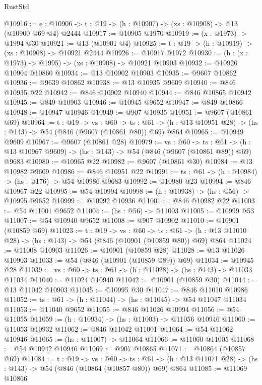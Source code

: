 \begin{lexlean}{RustStd}
\begin{coremodule}
@10916 := {e : @10906} -> {t : @19} -> (h : @10907) -> (xs : @10908) -> @13 (@10900 @69 @4) @2444
@10917 := @10905 @1970
@10919 := (x : @1973) -> @1994 @30
@10921 := @13 (@10901 @4)
@10925 := {t : @19} -> (h : @10919) -> (xs : @10908) -> @10921 @2444
@10926 := @10917 @1972
@10930 := (h : (x : @1973) -> @1995) -> (xs : @10908) -> @10921 @10903
@10932 := @10926 @10904 @10860
@10934 := @13 @10902 @10903
@10935 := @9607 @10862
@10936 := @9639 @10862
@10938 := @13 @10935 @9609
@10940 := @846 @10935 @22
@10942 := @846 @10902 @10940
@10944 := @846 @10865 @10942
@10945 := @849 @10903
@10946 := @10945 @9652
@10947 := @849 @10866
@10948 := @10947 @10946
@10949 := @907 @10935
@10951 := @9607 (@10861 @69)
@10964 := {t : @19} ->
  {vs : @60} ->
  {ts : @61} -> (h : @13 @10951 @28) -> (hs : @143) -> @54 (@846 (@9607 (@10861 @80)) @69) @864
@10965 := @10949 @9609
@10967 := @9607 (@10861 @28)
@10979 := {vs : @60} ->
  {ts : @61} -> (h : @13 @10967 @9609) -> (hs : @143) -> @54 (@846 (@9607 (@10861 @89)) @69) @9683
@10980 := @10965 @22
@10982 := @9607 (@10861 @30)
@10984 := @13 @10982 @9609
@10986 := @846 @10951 @22
@10991 := {ts : @61} -> (h : @10984) -> (hs : @176) -> @54 @10986 @9683
@10992 := @10980 @23
@10994 := @846 @10967 @22
@10995 := @54 @10994
@10998 := (h : @10938) -> (hs : @56) -> @10995 @9652
@10999 := @10992 @10936
@11001 := @846 @10982 @22
@11003 := @54 @11001 @9652
@11004 := (hs : @56) -> @11003
@11005 := @10999 @53
@11007 := @54 @10940 @9652
@11008 := @907 @10902
@11010 := @10901 (@10859 @69)
@11023 := {t : @19} ->
  {vs : @60} ->
  {ts : @61} -> (h : @13 @11010 @28) -> (hs : @143) -> @54 (@846 (@10901 (@10859 @80)) @69) @864
@11024 := @11008 @10903
@11026 := @10901 (@10859 @28)
@11028 := @13 @11026 @10903
@11033 := @54 (@846 (@10901 (@10859 @89)) @69)
@11034 := @10945 @28
@11039 := {vs : @60} -> {ts : @61} -> (h : @11028) -> (hs : @143) -> @11033 @11034
@11040 := @11024 @10940
@11042 := @10901 (@10859 @30)
@11044 := @13 @11042 @10903
@11045 := @10995 @30
@11047 := @846 @11010 @10986
@11052 := {ts : @61} -> (h : @11044) -> (hs : @11045) -> @54 @11047 @11034
@11053 := @11040 @9652
@11055 := @846 @11026 @10994
@11056 := @54 @11055
@11059 := (h : @10934) -> (hs : @11003) -> @11056 @10946
@11060 := @11053 @10932
@11062 := @846 @11042 @11001
@11064 := @54 @11062 @10946
@11065 := (hs : @11007) -> @11064
@11066 := @11060 @11005
@11068 := @54 @10942 @10946
@11069 := @907 @10865
@11071 := @10864 (@10857 @69)
@11084 := {t : @19} ->
  {vs : @60} ->
  {ts : @61} -> (h : @13 @11071 @28) -> (hs : @143) -> @54 (@846 (@10864 (@10857 @80)) @69) @864
@11085 := @11069 @10866

\end{coremodule}
\end{lexlean}

